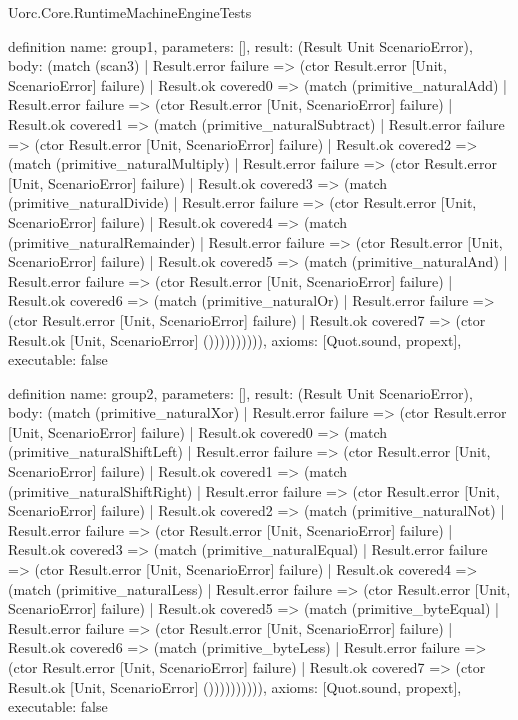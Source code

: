\begin{lexlean}{Uorc.Core.RuntimeMachineEngineTests}
\begin{semanticmodule}
definition{
  name: group1,
  parameters: [],
  result: (Result Unit ScenarioError),
  body: (match (scan3)
    | Result.error failure => (ctor Result.error [Unit, ScenarioError] failure)
    | Result.ok covered0 => (match (primitive_naturalAdd)
      | Result.error failure => (ctor Result.error [Unit, ScenarioError] failure)
      | Result.ok covered1 => (match (primitive_naturalSubtract)
        | Result.error failure => (ctor Result.error [Unit, ScenarioError] failure)
        | Result.ok covered2 => (match (primitive_naturalMultiply)
          | Result.error failure => (ctor Result.error [Unit, ScenarioError] failure)
          | Result.ok covered3 => (match (primitive_naturalDivide)
            | Result.error failure => (ctor Result.error [Unit, ScenarioError] failure)
            | Result.ok covered4 => (match (primitive_naturalRemainder)
              | Result.error failure => (ctor Result.error [Unit, ScenarioError] failure)
              | Result.ok covered5 => (match (primitive_naturalAnd)
                | Result.error failure => (ctor Result.error [Unit, ScenarioError] failure)
                | Result.ok covered6 => (match (primitive_naturalOr)
                  | Result.error failure => (ctor Result.error [Unit, ScenarioError] failure)
                  | Result.ok covered7 => (ctor Result.ok [Unit, ScenarioError] ()))))))))),
  axioms: [Quot.sound, propext],
  executable: false
}

definition{
  name: group2,
  parameters: [],
  result: (Result Unit ScenarioError),
  body: (match (primitive_naturalXor)
    | Result.error failure => (ctor Result.error [Unit, ScenarioError] failure)
    | Result.ok covered0 => (match (primitive_naturalShiftLeft)
      | Result.error failure => (ctor Result.error [Unit, ScenarioError] failure)
      | Result.ok covered1 => (match (primitive_naturalShiftRight)
        | Result.error failure => (ctor Result.error [Unit, ScenarioError] failure)
        | Result.ok covered2 => (match (primitive_naturalNot)
          | Result.error failure => (ctor Result.error [Unit, ScenarioError] failure)
          | Result.ok covered3 => (match (primitive_naturalEqual)
            | Result.error failure => (ctor Result.error [Unit, ScenarioError] failure)
            | Result.ok covered4 => (match (primitive_naturalLess)
              | Result.error failure => (ctor Result.error [Unit, ScenarioError] failure)
              | Result.ok covered5 => (match (primitive_byteEqual)
                | Result.error failure => (ctor Result.error [Unit, ScenarioError] failure)
                | Result.ok covered6 => (match (primitive_byteLess)
                  | Result.error failure => (ctor Result.error [Unit, ScenarioError] failure)
                  | Result.ok covered7 => (ctor Result.ok [Unit, ScenarioError] ()))))))))),
  axioms: [Quot.sound, propext],
  executable: false
}


\end{semanticmodule}
\end{lexlean}

